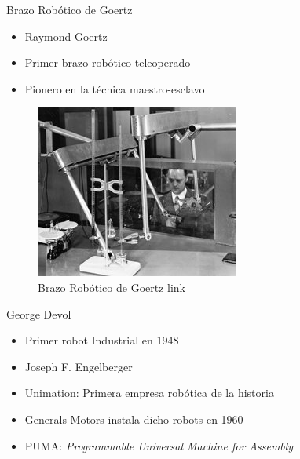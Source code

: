 \begin{frame}[fragile]{Brazo Robótico de Goertz}
\vspace{10px}
\pause
{}
\begin{block}{}
	\begin{itemize}
		\item Raymond Goertz
		\pause
		\item Primer brazo robótico teleoperado
		\pause
		\item Pionero en la técnica maestro-esclavo
	\end{itemize}
\end{block}
\begin{figure}
		\centering
		\includegraphics[scale=3.5]{./EtapaPrimeriza/imagenes/brazo.jpg}
		\caption{Brazo Robótico de Goertz \href{https://en.wikipedia.org/wiki/Raymond\_Goertz\#/media/File:Apf1-06395t.jpg}{link}}
\end{figure}
\end{frame}




\begin{frame}[fragile]{George Devol}
\vspace{10px}
\pause
{}
\begin{block}{}
	\begin{itemize}
		\item Primer robot Industrial en 1948
		\pause
		\item  Joseph F. Engelberger
		\pause
		\item Unimation: Primera empresa robótica de la historia
		\pause 
		\item Generals Motors instala dicho robots en 1960
		\pause
		\item PUMA: \textit{Programmable Universal Machine for Assembly}
	\end{itemize}
\end{block}
\end{frame}


